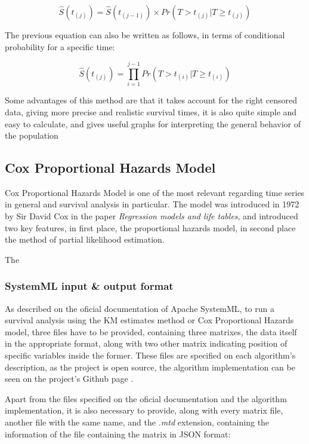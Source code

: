 \documentclass[11pt]{article} %
\begin{document}
    \begin{equation}
      \hat{S}(t_{(j)}) = \hat{S}(t_{(j-1)}) \times Pr(T>t_{(j)}|T \geq t_{(j)})
      \label{eq:KM-eq-surv}
    \end{equation}

    The previous equation can also be written as follows, in terms of conditional probability for a specific time:

    \begin{equation}
      \hat{S}(t_{(j)}) = \prod_{i=1}^{j-1} Pr(T>t_{(i)}|T\geq t_{(i)})
      \label{eq:KM-eq-probab}
    \end{equation}

    Some advantages of this method are that it takes account for the right censored data, giving more precise and realistic survival times, it is also quite simple and easy to calculate, and gives useful graphs for interpreting the general behavior of the population


  \subsection{Cox Proportional Hazards Model}

    Cox Proportional Hazards Model is one of the most relevant regarding time series in general and survival analysis in particular. The model was introduced in 1972 by Sir David Cox in the paper \emph{Regression models and life tables}, and introduced two key features, in first place, the proportional hazards model, in second place the method of partial likelihood estimation.

    The

  \subsubsection{SystemML input \& output format}

    As described on the oficial documentation of Apache SystemML, to run a survival analysis using the KM estimates method or Cox Proportional Hazards model, three files have to be provided, containing three matrixes, the data itself in the appropriate format, along with two other matrix indicating position of specific variables inside the former. These files are specified on each algorithm's description, as the project is open source, the algorithm implementation can be seen on the project's Github page \cite{systemml_github_page}.

    Apart from the files specified on the oficial documentation and the algorithm implementation, it is also necessary to provide, along with every matrix file, another file with the same name, and the \emph{.mtd} extension, containing the information of the file containing the matrix in JSON format:
\end{document}
